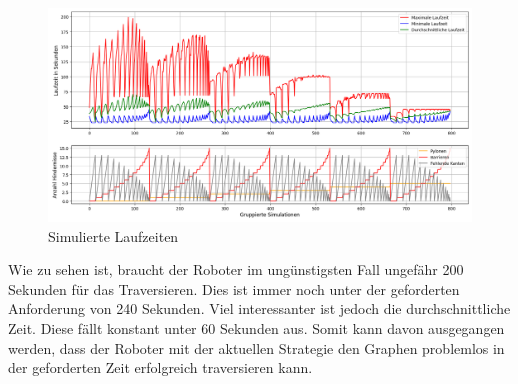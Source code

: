 \begin{figure}[H]
  \centering\includegraphics[width=\linewidth]{assets/informatik-prototyp/simulator/simulations_chart_sm.png}
  \caption{Simulierte Laufzeiten}
  \label{fig:simulation-run-chart}
\end{figure}

Wie zu sehen ist, braucht der Roboter im ungünstigsten Fall ungefähr 200 Sekunden für das Traversieren. Dies ist immer noch unter der geforderten Anforderung von 240 Sekunden. 
Viel interessanter ist jedoch die durchschnittliche Zeit. Diese fällt konstant unter 60 Sekunden aus.
Somit kann davon ausgegangen werden, dass der Roboter mit der aktuellen Strategie den Graphen problemlos in der geforderten Zeit erfolgreich traversieren kann.
